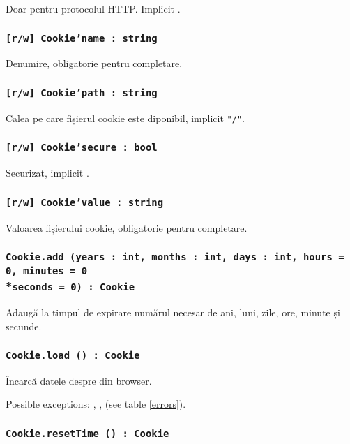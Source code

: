 Doar pentru protocolul HTTP. Implicit \false.

\subsubsection{\texttt{[r/w] Cookie'name : string}}

Denumire, obligatorie pentru completare.

\subsubsection{\texttt{[r/w] Cookie'path : string}}

Calea pe care fișierul cookie este diponibil, implicit \texttt{"/"}.

\subsubsection{\texttt{[r/w] Cookie'secure : bool}}

Securizat, implicit \false.

\subsubsection{\texttt{[r/w] Cookie'value : string}}

Valoarea fișierului cookie, obligatorie pentru completare.

\subsubsection{\texttt{Cookie.add (years : int, months : int, days : int, hours = 0, minutes = 0}\\*\noindent\texttt{seconds = 0) : Cookie}}

Adaugă la timpul de expirare numărul necesar de ani, luni, zile, ore, minute și secunde.

\subsubsection{\texttt{Cookie.load () : Cookie}}

Încarcă datele despre \cookie{} din browser.

Possible exceptions: , ,  (see table \ref{errors}).

\subsubsection{\texttt{Cookie.resetTime () : Cookie}}

